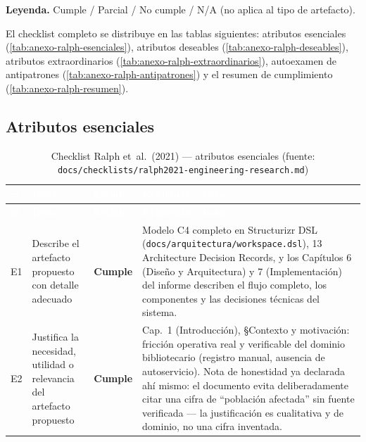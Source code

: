 \textbf{Leyenda.} Cumple / Parcial / No cumple / N/A (no aplica al tipo
de artefacto).

El checklist completo se distribuye en las tablas siguientes:
atributos esenciales (\autoref{tab:anexo-ralph-esenciales}), atributos
deseables (\autoref{tab:anexo-ralph-deseables}), atributos
extraordinarios (\autoref{tab:anexo-ralph-extraordinarios}),
autoexamen de antipatrones (\autoref{tab:anexo-ralph-antipatrones}) y
el resumen de cumplimiento (\autoref{tab:anexo-ralph-resumen}).

\subsection{Atributos esenciales}

\begin{center}
\scriptsize
\renewcommand{\arraystretch}{1.15}
\begin{longtable}{|p{0.7cm}|p{4.2cm}|p{1.6cm}|p{7.0cm}|}
\caption{Checklist Ralph et~al.\ (2021) --- atributos esenciales
  (fuente: \texttt{docs/checklists/ralph2021-engineering-research.md})}
\label{tab:anexo-ralph-esenciales}\\
\hline
\rowcolor{verdeuteq}
\textcolor{white}{\textbf{\#}} &
\textcolor{white}{\textbf{Ítem}} &
\textcolor{white}{\textbf{Estado}} &
\textcolor{white}{\textbf{Evidencia / nota}} \\
\hline
\endfirsthead
\hline
\rowcolor{verdeuteq}
\textcolor{white}{\textbf{\#}} &
\textcolor{white}{\textbf{Ítem}} &
\textcolor{white}{\textbf{Estado}} &
\textcolor{white}{\textbf{Evidencia / nota}} \\
\hline
\endhead
\hline
\endfoot
E1 & Describe el artefacto propuesto con detalle adecuado & \textbf{Cumple} & Modelo C4 completo en Structurizr DSL (\texttt{docs/arquitectura/workspace.dsl}), 13 Architecture Decision Records, y los Capítulos 6 (Diseño y Arquitectura) y 7 (Implementación) del informe describen el flujo completo, los componentes y las decisiones técnicas del sistema. \\
\hline
E2 & Justifica la necesidad, utilidad o relevancia del artefacto propuesto & \textbf{Cumple} & Cap.\ 1 (Introducción), §Contexto y motivación: fricción operativa real y verificable del dominio bibliotecario (registro manual, ausencia de autoservicio). Nota de honestidad ya declarada ahí mismo: el documento evita deliberadamente citar una cifra de ``población afectada'' sin fuente verificada --- la justificación es cualitativa y de dominio, no una cifra inventada. \\

\end{longtable}
\end{center}
